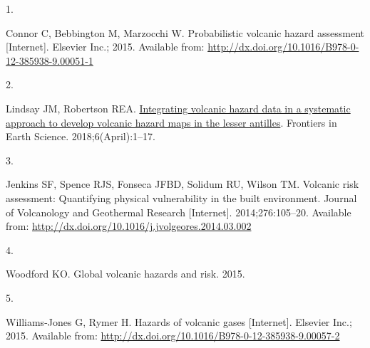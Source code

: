 \documentclass[
  letterpaper,
]{book}
\newlength{\cslhangindent}
\newlength{\csllabelwidth}
\newenvironment{CSLReferences}[2] %
 {\begin{list}{}{%
  \setlength{\itemindent}{0pt}
  \setlength{\leftmargin}{0pt}
  \setlength{\parsep}{0pt}
  \ifodd #1
   \setlength{\leftmargin}{\cslhangindent}
   \setlength{\itemindent}{-1\cslhangindent}
  \fi
  \setlength{\itemsep}{#2\baselineskip}}}
 {\end{list}}
\newcommand{\CSLLeftMargin}[1]{\parbox[t]{\csllabelwidth}{\strut#1\strut}}
\newcommand{\CSLRightInline}[1]{\parbox[t]{\linewidth - \csllabelwidth}{\strut#1\strut}}
\begin{document}
\label{refs}
\begin{CSLReferences}{0}{1}
\CSLLeftMargin{1. }%
\CSLRightInline{Connor C, Bebbington M, Marzocchi W. Probabilistic
volcanic hazard assessment {[}Internet{]}. Elsevier Inc.; 2015.
Available from:
\url{http://dx.doi.org/10.1016/B978-0-12-385938-9.00051-1}}

\CSLLeftMargin{2. }%
\CSLRightInline{Lindsay JM, Robertson REA.
\href{https://doi.org/10.3389/feart.2018.00042}{Integrating volcanic
hazard data in a systematic approach to develop volcanic hazard maps in
the lesser antilles}. Frontiers in Earth Science. 2018;6(April):1--17. }

\CSLLeftMargin{3. }%
\CSLRightInline{Jenkins SF, Spence RJS, Fonseca JFBD, Solidum RU, Wilson
TM. Volcanic risk assessment: Quantifying physical vulnerability in the
built environment. Journal of Volcanology and Geothermal Research
{[}Internet{]}. 2014;276:105--20. Available from:
\url{http://dx.doi.org/10.1016/j.jvolgeores.2014.03.002}}

\CSLLeftMargin{4. }%
\CSLRightInline{Woodford KO. Global volcanic hazards and risk. 2015. }

\CSLLeftMargin{5. }%
\CSLRightInline{Williams-Jones G, Rymer H. Hazards of volcanic gases
{[}Internet{]}. Elsevier Inc.; 2015. Available from:
\url{http://dx.doi.org/10.1016/B978-0-12-385938-9.00057-2}}

\end{CSLReferences}


\backmatter
\end{document}
